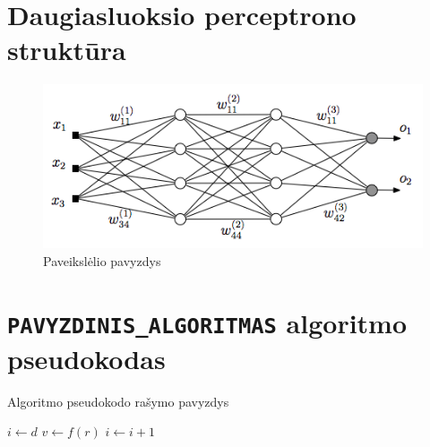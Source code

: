 \documentclass[11pt, a4paper, lithuanian]{article}
\begin{document}
\section{Daugiasluoksio perceptrono struktūra}
\begin{figure}[H]
    \centering
\includegraphics[scale=0.5]{img/MLP}
\caption{Paveikslėlio pavyzdys}
\label{img:mlp}
\end{figure}

\newpage
\section{\texttt{PAVYZDINIS\_ALGORITMAS} algoritmo pseudokodas}
\begin{algorithm}[H]
\caption{Algoritmo pseudokodo rašymo pavyzdys}
\begin{algorithmic}[1]
    \State $i \gets d $
            \State $v \gets f(r)$  
        \EndFor
        \State $i \gets i + 1$
    \EndWhile
\EndProcedure
\end{algorithmic}
\label{alg:multivariate pseudocode}
\end{algorithm}
\end{document}
